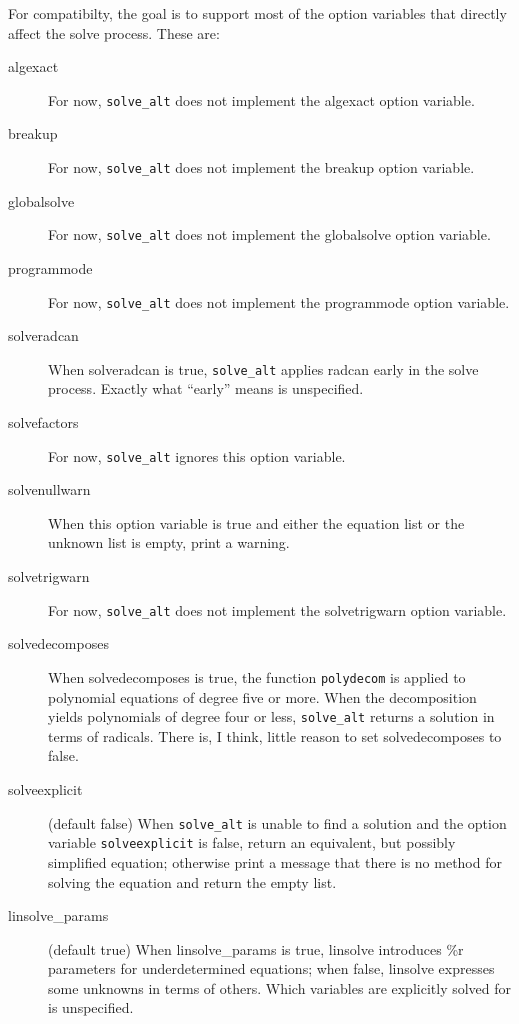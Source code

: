 \documentclass[]{scrartcl}
\newcommand{\altsolve}{\texttt{solve\_alt}}
\newcommand{\solveexplicit}{\texttt{solveexplicit}}
\begin{document}
For compatibilty, the goal is to support most of the option variables that directly affect the solve process. These are:
\begin{description}

\item [algexact] For now, \altsolve\/ does not implement the algexact option variable.

\item [breakup] For now, \altsolve\/ does not implement the breakup option variable.

\item [globalsolve] For now, \altsolve\/ does not implement the globalsolve option variable.

\item [programmode] For now, \altsolve\/ does not implement the programmode option variable.

\item [solveradcan] When solveradcan is true, \altsolve\/ applies radcan early in the solve process.
      Exactly what ``early'' means is unspecified.

\item [solvefactors] For now, \altsolve\/ ignores this option variable.

\item [solvenullwarn] When this option variable is true and either the equation list or the unknown list is
empty, print a warning.

\item [solvetrigwarn] For now, \altsolve\/ does not implement the solvetrigwarn option variable.

\item [solvedecomposes] When solvedecomposes is true, the function \texttt{polydecom} is applied to
polynomial equations of degree five or more. When the decomposition yields polynomials of degree four
or less, \altsolve\/ returns a solution in terms of radicals. There is, I think, little reason to
set solvedecomposes to false.

\item [solveexplicit] (default false) When \altsolve\/  is unable to find a solution and the option variable \solveexplicit\/ is false, return an equivalent, but possibly simplified equation;  otherwise print a message that there is no method for solving the equation and return the empty list.

\item [linsolve\_params] (default true) When linsolve\_params is true, linsolve introduces \%r parameters for underdetermined equations; when false, linsolve expresses some unknowns in terms of others. Which variables are explicitly solved for is unspecified.


\end{description}
\end{document}
